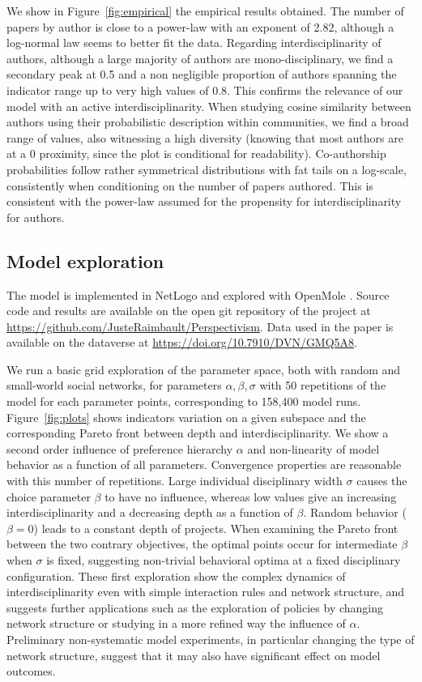 \documentclass[utf8,11pt]{article}
\begin{document}
We show in Figure~\ref{fig:empirical} the empirical results obtained. The number of papers by author is close to a power-law with an exponent of 2.82, although a log-normal law seems to better fit the data. Regarding interdisciplinarity of authors, although a large majority of authors are mono-disciplinary, we find a secondary peak at 0.5 and a non negligible proportion of authors spanning the indicator range up to very high values of 0.8. This confirms the relevance of our model with an active interdisciplinarity. When studying cosine similarity between authors using their probabilistic description within communities, we find a broad range of values, also witnessing a high diversity (knowing that most authors are at a 0 proximity, since the plot is conditional for readability). Co-authorship probabilities follow rather symmetrical distributions with fat tails on a log-scale, consistently when conditioning on the number of papers authored. This is consistent with the power-law assumed for the propensity for interdisciplinarity for authors.



\subsection{Model exploration}

The model is implemented in NetLogo \cite{tisue2004netlogo} and explored with OpenMole \cite{reuillon2013openmole}. Source code and results are available on the open git repository of the project at \url{https://github.com/JusteRaimbault/Perspectivism}. Data used in the paper is available on the dataverse at \url{https://doi.org/10.7910/DVN/GMQ5A8}.

We run a basic grid exploration of the parameter space, both with random and small-world social networks, for parameters $\alpha,\beta,\sigma$ with 50 repetitions of the model for each parameter points, corresponding to 158,400 model runs. Figure~\ref{fig:plots} shows indicators variation on a given subspace and the corresponding Pareto front between depth and interdisciplinarity. We show a second order influence of preference hierarchy $\alpha$ and non-linearity of model behavior as a function of all parameters. Convergence properties are reasonable with this number of repetitions. Large individual disciplinary width $\sigma$ causes the choice parameter $\beta$ to have no influence, whereas low values give an increasing interdisciplinarity and a decreasing depth as a function of $\beta$. Random behavior ($\beta = 0$) leads to a constant depth of projects. When examining the Pareto front between the two contrary objectives, the optimal points occur for intermediate $\beta$ when $\sigma$ is fixed, suggesting non-trivial behavioral optima at a fixed disciplinary configuration. These first exploration show the complex dynamics of interdisciplinarity even with simple interaction rules and network structure, and suggests further applications such as the exploration of policies by changing network structure or studying in a more refined way the influence of $\alpha$. Preliminary non-systematic model experiments, in particular changing the type of network structure, suggest that it may also have significant effect on model outcomes.
\end{document}

